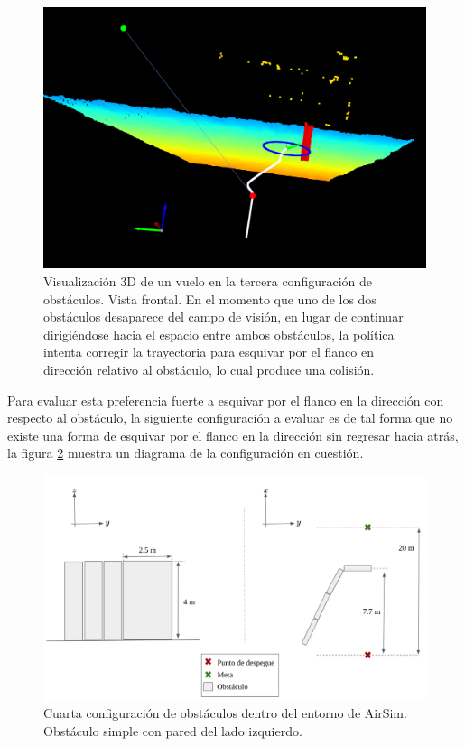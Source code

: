 \begin{figure}[H]
    \centering
    \includegraphics[scale=0.32]{partes/img/depth-parallel-5-front-collision.png}
    \caption[Visualización 3D de un vuelo en la tercera configuración de obstáculos. Vista frontal. Colisión.]{Visualización 3D de un vuelo en la tercera configuración de obstáculos. Vista frontal. En el momento que uno de los dos obstáculos desaparece del campo de visión, en lugar de continuar dirigiéndose hacia el espacio entre ambos obstáculos, la política intenta corregir la trayectoria para esquivar por el flanco en dirección  relativo al obstáculo, lo cual produce una colisión. }
    \label{fig:depth-parallel-5}
\end{figure}


Para evaluar esta preferencia fuerte a esquivar por el flanco en la dirección  con respecto al obstáculo, la siguiente configuración a evaluar es de tal forma que no existe una forma de esquivar por el flanco en la dirección  sin regresar hacia atrás, la figura \ref{fig:config-4-wall} muestra un diagrama de la configuración en cuestión.

\begin{figure}[H]
    \centering
    \includegraphics[scale=0.35]{partes/img/config-4-left-wall.png}
    \caption[Cuarta configuración de obstáculos dentro del entorno de AirSim.]{Cuarta configuración de obstáculos dentro del entorno de AirSim. Obstáculo simple con pared del lado izquierdo.}
    \label{fig:config-4-wall}
\end{figure}

